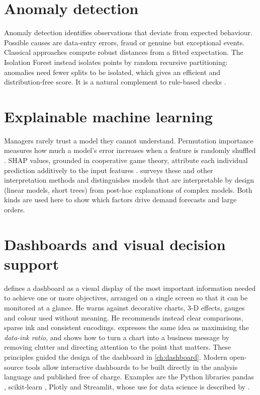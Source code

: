 \section{Anomaly detection}
Anomaly detection identifies observations that deviate from expected behaviour. Possible causes are data-entry
errors, fraud or genuine but exceptional events. Classical approaches compute robust distances from a fitted
expectation. The Isolation Forest \citep{liu2008} instead isolates points by random recursive partitioning:
anomalies need fewer splits to be isolated, which gives an efficient and distribution-free score. It is a
natural complement to rule-based checks \citep{aggarwal2017}.

\section{Explainable machine learning}
Managers rarely trust a model they cannot understand. Permutation importance measures how much a model's error
increases when a feature is randomly shuffled \citep{breiman2001}. SHAP values, grounded in cooperative game
theory, attribute each individual prediction additively to the input features \citep{lundberg2017}.
\citet{molnar2022} surveys these and other interpretation methods and distinguishes models that are
interpretable by design (linear models, short trees) from post-hoc explanations of complex models. Both kinds
are used here to show which factors drive demand forecasts and large orders.

\section{Dashboards and visual decision support}
\citet{few2013} defines a dashboard as a visual display of the most important information needed to achieve one
or more objectives, arranged on a single screen so that it can be monitored at a glance. He warns against
decorative charts, 3-D effects, gauges and colour used without meaning. He recommends instead clear
comparisons, sparse ink and consistent encodings. \citet{tufte2001} expresses the same idea as maximising the
\emph{data-ink ratio}, and \citet{knaflic2015} shows how to turn a chart into a business message by removing
clutter and directing attention to the point that matters. These principles guided the design of the dashboard in
\cref{ch:dashboard}. Modern open-source tools allow interactive dashboards to be built directly in the analysis
language and published free of charge. Examples are the Python libraries pandas \citep{mckinney2022},
scikit-learn \citep{pedregosa2011}, Plotly and Streamlit, whose use for data science is described by
\citet{vanderplas2016}.

